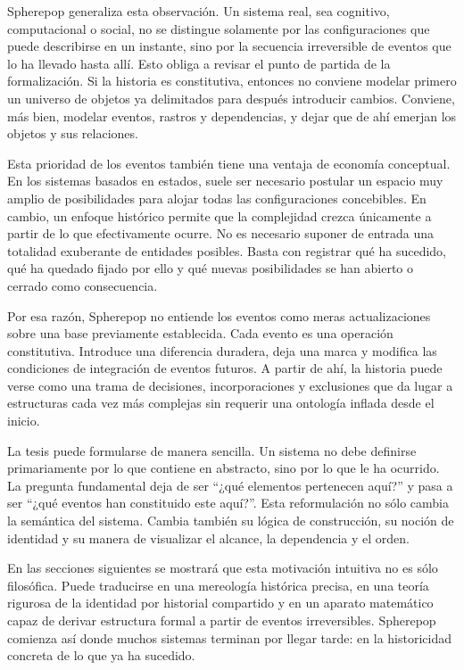 \documentclass[12pt]{article}
\begin{document}
Spherepop generaliza esta observación. Un sistema real, sea cognitivo, computacional o social, no se distingue solamente por las configuraciones que puede describirse en un instante, sino por la secuencia irreversible de eventos que lo ha llevado hasta allí. Esto obliga a revisar el punto de partida de la formalización. Si la historia es constitutiva, entonces no conviene modelar primero un universo de objetos ya delimitados para después introducir cambios. Conviene, más bien, modelar eventos, rastros y dependencias, y dejar que de ahí emerjan los objetos y sus relaciones.

Esta prioridad de los eventos también tiene una ventaja de economía conceptual. En los sistemas basados en estados, suele ser necesario postular un espacio muy amplio de posibilidades para alojar todas las configuraciones concebibles. En cambio, un enfoque histórico permite que la complejidad crezca únicamente a partir de lo que efectivamente ocurre. No es necesario suponer de entrada una totalidad exuberante de entidades posibles. Basta con registrar qué ha sucedido, qué ha quedado fijado por ello y qué nuevas posibilidades se han abierto o cerrado como consecuencia.

Por esa razón, Spherepop no entiende los eventos como meras actualizaciones sobre una base previamente establecida. Cada evento es una operación constitutiva. Introduce una diferencia duradera, deja una marca y modifica las condiciones de integración de eventos futuros. A partir de ahí, la historia puede verse como una trama de decisiones, incorporaciones y exclusiones que da lugar a estructuras cada vez más complejas sin requerir una ontología inflada desde el inicio.

La tesis puede formularse de manera sencilla. Un sistema no debe definirse primariamente por lo que contiene en abstracto, sino por lo que le ha ocurrido. La pregunta fundamental deja de ser ``¿qué elementos pertenecen aquí?'' y pasa a ser ``¿qué eventos han constituido este aquí?''. Esta reformulación no sólo cambia la semántica del sistema. Cambia también su lógica de construcción, su noción de identidad y su manera de visualizar el alcance, la dependencia y el orden.

En las secciones siguientes se mostrará que esta motivación intuitiva no es sólo filosófica. Puede traducirse en una mereología histórica precisa, en una teoría rigurosa de la identidad por historial compartido y en un aparato matemático capaz de derivar estructura formal a partir de eventos irreversibles. Spherepop comienza así donde muchos sistemas terminan por llegar tarde: en la historicidad concreta de lo que ya ha sucedido.
\end{document}

